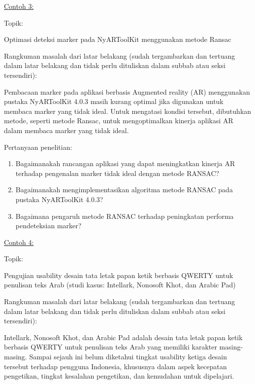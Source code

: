 \noindent\underline{Contoh 3:}

\noindent Topik: 

\begin{displayquote}
  Optimasi deteksi marker pada NyARToolKit menggunakan metode Ransac
\end{displayquote}

Rangkuman masalah dari latar belakang (sudah tergambarkan dan tertuang dalam latar belakang dan tidak perlu dituliskan dalam subbab atau seksi tersendiri):

\begin{displayquote}
Pembacaan marker pada aplikasi berbasis Augmented reality (AR) menggunakan pustaka NyARToolKit 4.0.3 masih kurang optimal jika digunakan untuk membaca marker yang tidak ideal. Untuk mengatasi kondisi tersebut, dibutuhkan metode, seperti metode Ransac, untuk mengoptimalkan kinerja aplikasi AR dalam membaca marker yang tidak ideal.
\end{displayquote}

\noindent Pertanyaan penelitian:

\begin{enumerate}
  \item Bagaimanakah rancangan aplikasi yang dapat meningkatkan kinerja AR terhadap pengenalan marker tidak ideal dengan metode RANSAC?
  \item Bagaimanakah mengimplementasikan algoritma metode RANSAC pada pustaka NyARToolKit 4.0.3?
  \item Bagaimana pengaruh metode RANSAC terhadap peningkatan performa pendeteksian marker? 
\end{enumerate}

\noindent\underline{Contoh 4:}

\noindent Topik: 
\begin{displayquote}
  Pengujian usability desain tata letak papan ketik berbasis QWERTY untuk penulisan teks Arab (studi kasus: Intellark, Nonosoft Khot, dan Arabic Pad)
\end{displayquote}


Rangkuman masalah dari latar belakang (sudah tergambarkan dan tertuang dalam latar belakang dan tidak perlu dituliskan dalam subbab atau seksi tersendiri):

\begin{displayquote}
Intellark, Nonosoft Khot, dan Arabic Pad adalah desain tata letak papan ketik berbasis QWERTY untuk penulisan teks Arab yang memiliki karakter masing-masing. Sampai sejauh ini belum diketahui tingkat usability ketiga desain tersebut terhadap pengguna Indonesia, khususnya dalam aspek kecepatan pengetikan, tingkat kesalahan pengetikan, dan kemudahan untuk dipelajari.  
\end{displayquote}

